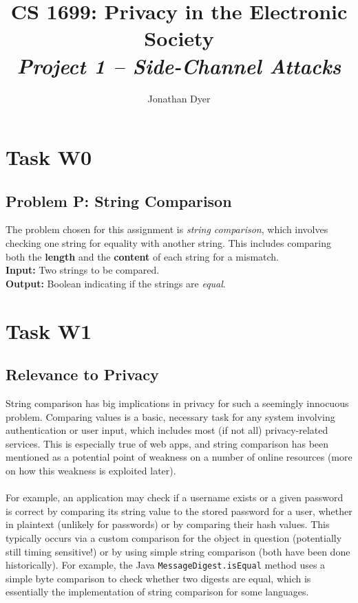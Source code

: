 \documentclass{article}
\author{Jonathan Dyer}
\title{CS 1699: Privacy in the Electronic Society \\
        \textit{Project 1 -- Side-Channel Attacks}}
\providecommand{\inlinecode}{\texttt}
\begin{document}
\maketitle

\tableofcontents

\section{Task W0}
\subsection{Problem P: String Comparison}
The problem chosen for this assignment is \textit{string comparison}, which involves checking one string for equality with another string.
This includes comparing both the \textbf{length} and the \textbf{content} of each string for a mismatch. \\
\textbf{Input:  } Two strings to be compared. \\
\textbf{Output: } Boolean indicating if the strings are \textit{equal}.

\section{Task W1}
\subsection{Relevance to Privacy}

String comparison has big implications in privacy for such a seemingly innocuous problem. Comparing values is a basic, necessary task for any system involving authentication or user input, which includes most (if not all) privacy-related services. This is especially true of web apps, and string comparison has been mentioned as a potential point of weakness on a number of online resources (more on how this weakness is exploited later). \cite{thisdata} \\
  \\
For example, an application may check if a username exists or a given password is correct by comparing its string value to the stored password for a user, whether in plaintext (unlikely for passwords) or by comparing their hash values. This typically occurs via a custom comparison for the object in question (potentially still timing sensitive!) or by using simple string comparison (both have been done historically). \cite{codahale} For example, the Java \inlinecode{MessageDigest.isEqual} method uses a simple byte comparison to check whether two digests are equal, which is essentially the implementation of string comparison for some languages.
\end{document}
